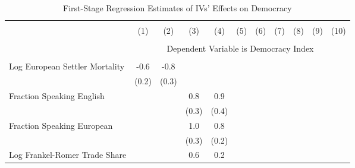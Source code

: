 
\begin{table}[!htbp] \centering
  \caption{First-Stage Regression Estimates of IVs' Effects on Democracy}
  \label{tab:first-stage} 
  \footnotesize
  \begin{threeparttable}
\begin{tabular}{@{\extracolsep{0pt}}lcccccccccc} 
\\[-1.8ex]\hline 
\hline 
\\[-1.8ex] & (1) & (2) & (3) & (4) & (5) & (6) & (7) & (8) & (9) & (10)\\ 
\hline \\[-1.8ex] 
   & \multicolumn{10}{c}{Dependent Variable is Democracy Index} \\ 
\cline{2-11}  \\[-1.8ex]

Log European Settler Mortality&        -0.6\sym{**} &        -0.8\sym{**} &                     &                     &                     &                     &                     &                     &                     &                     \\
                    &       (0.2)         &       (0.3)         &                     &                     &                     &                     &                     &                     &                     &                     \\
Fraction Speaking English&                     &                     &         0.8\sym{*}  &         0.9\sym{*}  &                     &                     &                     &                     &                     &                     \\
                    &                     &                     &       (0.3)         &       (0.4)         &                     &                     &                     &                     &                     &                     \\
Fraction Speaking European&                     &                     &         1.0\sym{**} &         0.8\sym{***}&                     &                     &                     &                     &                     &                     \\
                    &                     &                     &       (0.3)         &       (0.2)         &                     &                     &                     &                     &                     &                     \\
Log Frankel-Romer Trade Share&                     &                     &         0.6\sym{**} &         0.2         &                     &                     &                     &                     &                     &                     \\

\end{tabular}
\end{threeparttable}
\end{table}
